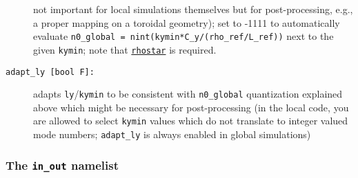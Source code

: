 \documentclass[12pt]{article}
\begin{document}
\begin{description}
  not important for local simulations themselves but for post-processing, e.g., a proper mapping on a toroidal geometry);
  set to -1111 to automatically evaluate {\tt n0\_global = nint(kymin*C\_y/(rho\_ref/L\_ref))} next to the given {\tt kymin};
  note that \hyperlink{rhostar}{\tt rhostar} is required.
\item[\texttt{adapt\_ly [bool F]:}] adapts {\tt ly}/{\tt kymin} to be consistent with {\tt n0\_global} quantization explained
 above which might be necessary for post-processing
 (in the local code, you are allowed to select {\tt kymin} values which do not translate to integer valued mode
 numbers; {\tt adapt\_ly} is always enabled in global simulations)
\end{description}

\subsubsection{The \texttt{in\_out} namelist}
\label{subsubsec:inout}
\end{document}
